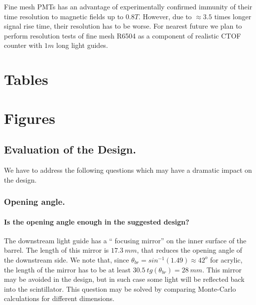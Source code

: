 Fine mesh PMTs has an advantage of experimentally confirmed immunity of their time resolution to  
magnetic fields  up to $0.8T$\cite{fmtr01}. However, due to $\approx3.5$ times longer signal rise time,
their  resolution has to be  worse.  For nearest future we plan to perform resolution tests of fine mesh R6504  
as a component of  realistic CTOF counter with $1m$ long light guides.  
















\newpage



\newpage
\section{Tables}
 

\newpage
\section{Figures}
 





\subsection{Evaluation of the Design.}
We have to address the following questions which may have a dramatic impact on the design.
\subsubsection{Opening angle.}
\paragraph{Is the opening angle enough in the suggested design?}
The downstream light guide has a `` focusing mirror'' on the inner surface of the barrel.
The length of this  mirror   is $17.3~mm$, that  reduces the opening angle of the downstream side.
We note that, since $\theta_{br}=sin^{-1}(1.49)\approx42^o$ for acrylic, the length of the mirror has to be 
at least $30.5~tg(\theta_{br})=28~mm$.
This mirror may be avoided in the design,
 but in such case some light will be reflected back 
into the scintillator.
This question may be solved by comparing  Monte-Carlo calculations\cite{mutch} for different dimensions.
